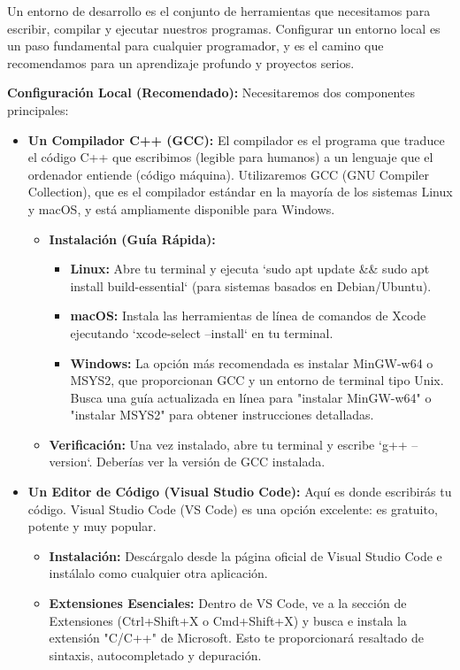 Un entorno de desarrollo es el conjunto de herramientas que necesitamos para escribir, compilar y ejecutar nuestros programas. Configurar un entorno local es un paso fundamental para cualquier programador, y es el camino que recomendamos para un aprendizaje profundo y proyectos serios.

\textbf{Configuración Local (Recomendado):}
Necesitaremos dos componentes principales:
\begin{itemize}
    \item \textbf{Un Compilador C++ (GCC):} El compilador es el programa que traduce el código C++ que escribimos (legible para humanos) a un lenguaje que el ordenador entiende (código máquina). Utilizaremos GCC (GNU Compiler Collection), que es el compilador estándar en la mayoría de los sistemas Linux y macOS, y está ampliamente disponible para Windows.
        \begin{itemize}
            \item \textbf{Instalación (Guía Rápida):}
                \begin{itemize}
                    \item \textbf{Linux:} Abre tu terminal y ejecuta `sudo apt update \&\& sudo apt install build-essential` (para sistemas basados en Debian/Ubuntu).
                    \item \textbf{macOS:} Instala las herramientas de línea de comandos de Xcode ejecutando `xcode-select --install` en tu terminal.
                    \item \textbf{Windows:} La opción más recomendada es instalar MinGW-w64 o MSYS2, que proporcionan GCC y un entorno de terminal tipo Unix. Busca una guía actualizada en línea para "instalar MinGW-w64" o "instalar MSYS2" para obtener instrucciones detalladas.
                \end{itemize}
            \item \textbf{Verificación:} Una vez instalado, abre tu terminal y escribe `g++ --version`. Deberías ver la versión de GCC instalada.
        \end{itemize}
    \item \textbf{Un Editor de Código (Visual Studio Code):} Aquí es donde escribirás tu código. Visual Studio Code (VS Code) es una opción excelente: es gratuito, potente y muy popular.
        \begin{itemize}
            \item \textbf{Instalación:} Descárgalo desde la página oficial de Visual Studio Code e instálalo como cualquier otra aplicación.
            \item \textbf{Extensiones Esenciales:} Dentro de VS Code, ve a la sección de Extensiones (Ctrl+Shift+X o Cmd+Shift+X) y busca e instala la extensión "C/C++" de Microsoft. Esto te proporcionará resaltado de sintaxis, autocompletado y depuración.
        \end{itemize}
\end{itemize}

